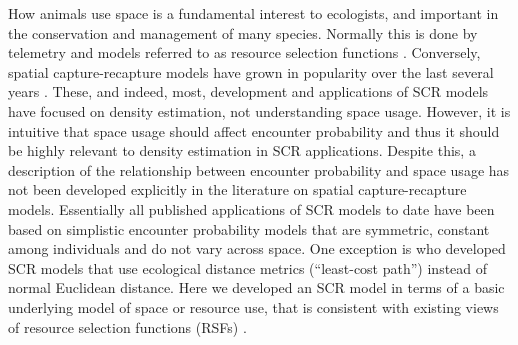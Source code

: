 How animals use space is a fundamental interest to ecologists, and
important in the conservation and management of many species.
Normally this is done
by telemetry and models referred to as resource selection functions
\citep{manly_etal:2002}.  Conversely, spatial capture-recapture models
have grown in popularity over the last several years
\citep{efford:2004,borchers_efford:2008, royle:2008,
  efford_etal:2009ecol,royle_etal:2009ecol, gardner_etal:2010ecol,
  gardner_etal:2010jwm, kery_etal:2010,
  sollmann_etal:2011,mollet_etal:2012,gopalaswamy_etal:2012}. These,
and indeed, most,
 development and applications of SCR models have focused on density
estimation, not understanding space usage.  However, it is intuitive that space
usage should affect encounter probability and thus it should be highly relevant
to density estimation in SCR applications. Despite this, a description
of the
relationship between encounter probability and space usage has not
been developed explicitly in the literature on spatial
capture-recapture models.  Essentially all
published applications of SCR models to date have been based on
simplistic encounter probability models that are symmetric, constant
among individuals and do not vary across space. One exception is
\citet{royle_etal:2012ecol} who developed SCR models that use
ecological distance metrics (``least-cost path'')
instead of normal Euclidean distance. Here
we developed an SCR model in terms of a basic underlying model of
space or resource use, that is consistent with existing views of
resource selection functions (RSFs) \citep{manly_etal:2002}.

